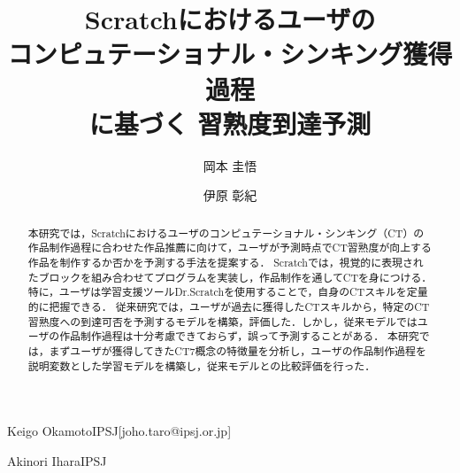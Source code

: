 \documentclass[submit,ses,noauthor]{ipsj}
\begin{document}
\title{Scratchにおけるユーザの\\コンピュテーショナル・シンキング獲得過程\\に基づく
習熟度到達予測}





\author{岡本 圭悟}{Keigo Okamoto}{IPSJ}[joho.taro@ipsj.or.jp]
\author{伊原 彰紀}{Akinori Ihara}{IPSJ}

\begin{abstract}
本研究では，Scratchにおけるユーザのコンピュテーショナル・シンキング（CT）の作品制作過程に合わせた作品推薦に向けて，ユーザが予測時点でCT習熟度が向上する作品を制作するか否かを予測する手法を提案する．
Scratchでは，視覚的に表現されたブロックを組み合わせてプログラムを実装し，作品制作を通してCTを身につける．特に，ユーザは学習支援ツールDr.Scratchを使用することで，自身のCTスキルを定量的に把握できる．
従来研究では，ユーザが過去に獲得したCTスキルから，特定のCT習熟度への到達可否を予測するモデルを構築，評価した．しかし，従来モデルではユーザの作品制作過程は十分考慮できておらず，誤って予測することがある．
本研究では，まずユーザが獲得してきたCT7概念の特徴量を分析し，ユーザの作品制作過程を説明変数とした学習モデルを構築し，従来モデルとの比較評価を行った．
\end{abstract}


%
%
%
\end{document}
